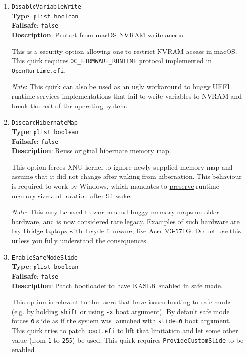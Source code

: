 \documentclass[]{article}
\begin{document}
\begin{enumerate}
\item
  \texttt{DisableVariableWrite}\\
  \textbf{Type}: \texttt{plist\ boolean}\\
  \textbf{Failsafe}: \texttt{false}\\
  \textbf{Description}: Protect from macOS NVRAM write access.

  This is a security option allowing one to restrict NVRAM access in macOS.
  This quirk requires \texttt{OC\_FIRMWARE\_RUNTIME} protocol implemented
  in \texttt{OpenRuntime.efi}.

  \emph{Note}: This quirk can also be used as an ugly workaround to buggy UEFI
  runtime services implementations that fail to write variables to NVRAM and
  break the rest of the operating system.

\item
  \texttt{DiscardHibernateMap}\\
  \textbf{Type}: \texttt{plist\ boolean}\\
  \textbf{Failsafe}: \texttt{false}\\
  \textbf{Description}: Reuse original hibernate memory map.

  This option forces XNU kernel to ignore newly supplied memory map and assume
  that it did not change after waking from hibernation. This behaviour is required
  to work by Windows, which mandates to
  \href{https://docs.microsoft.com/en-us/windows-hardware/design/device-experiences/oem-uefi#hibernation-state-s4-transition-requirements}{preserve}
  runtime memory size and location after S4 wake.

  \emph{Note}: This may be used to workaround buggy memory maps on older hardware,
  and is now considered rare legacy. Examples of such hardware are Ivy Bridge laptops
  with Insyde firmware, like Acer V3-571G. Do not use this unless you fully understand
  the consequences.

\item
  \texttt{EnableSafeModeSlide}\\
  \textbf{Type}: \texttt{plist\ boolean}\\
  \textbf{Failsafe}: \texttt{false}\\
  \textbf{Description}: Patch bootloader to have KASLR enabled in safe mode.

  This option is relevant to the users that have issues booting to safe mode
  (e.g. by holding \texttt{shift} or using \texttt{-x} boot argument). By default
  safe mode forces \texttt{0} slide as if the system was launched with \texttt{slide=0}
  boot argument. This quirk tries to patch \texttt{boot.efi} to lift that limitation
  and let some other value (from \texttt{1} to \texttt{255}) be used. This quirk requires
  \texttt{ProvideCustomSlide} to be enabled.


\end{enumerate}
\end{document}
